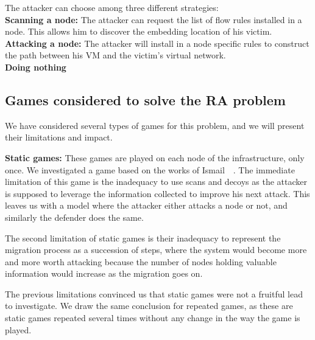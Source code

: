 The attacker can choose among three different strategies:\\
\textbf{Scanning a node: } The attacker can request the list of  flow rules installed in a node. This allows him to discover the embedding location of his victim.\\
\textbf{Attacking a node: } The attacker will install in a node specific rules to construct the path between his VM and the victim's virtual network.\\
\textbf{Doing nothing}\\



\subsection{Games considered to solve the RA problem}
We have considered several types of games for this problem, and we will present their limitations and impact.

\textbf{Static games:} These games are played on each node of the infrastructure, only once. We investigated a game based on the works of Ismail~\etal~\cite{Chen2009,interdep-ismail2017}. The immediate limitation of this game is the inadequacy to use scans and decoys as the attacker is supposed to leverage the information collected to improve his next attack. This leaves us with a model where the attacker either attacks a node or not, and similarly the defender does the same.

The second limitation of static games is their inadequacy to represent the migration process as a succession of steps, where the system would become more and more worth attacking because the number of nodes holding valuable information would increase as the migration goes on.


The previous limitations convinced us that static games were not a fruitful lead to investigate.
We draw the same conclusion for repeated games, as these are static games repeated several times without any change in the way the game is played.



